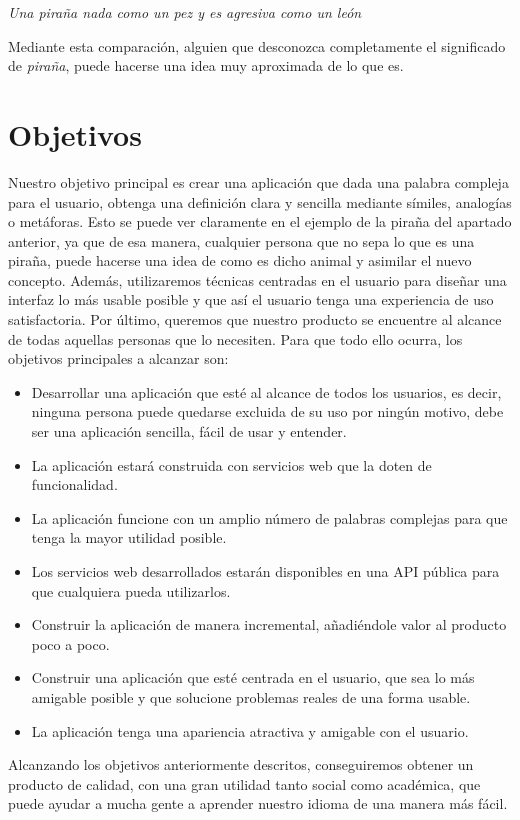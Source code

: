 \textit{Una piraña nada como un pez y es agresiva como un león} \newline

Mediante esta comparación, alguien que desconozca completamente el significado de \textit{piraña}, puede hacerse una idea muy aproximada de lo que es.
\section{Objetivos}
\label{cap:sec:objetivos}
Nuestro objetivo principal es crear una aplicación que dada una palabra compleja para el usuario, obtenga una definición clara y sencilla mediante símiles, analogías o metáforas. 
Esto se puede ver claramente en el ejemplo de la piraña del apartado anterior, ya que de esa manera, cualquier persona que no sepa lo que es una piraña, puede hacerse una idea de como es dicho animal y asimilar el nuevo concepto. Además, utilizaremos técnicas centradas en el usuario para diseñar una interfaz lo más usable posible y que así el usuario tenga una experiencia de uso satisfactoria. Por último, queremos que nuestro producto se encuentre al alcance de todas aquellas personas que lo necesiten.
 Para que todo ello ocurra, los objetivos principales a alcanzar son:
\begin{itemize}
	\item Desarrollar una aplicación que esté al alcance de todos los usuarios, es decir, ninguna persona puede quedarse excluida de su uso por ningún motivo, debe ser una aplicación sencilla, fácil de usar y entender.

	\item La aplicación estará construida con servicios web que la doten de funcionalidad.
	
	\item La aplicación funcione con un amplio número de palabras complejas para que tenga la mayor utilidad posible.
	
	\item Los servicios web desarrollados estarán disponibles en una API pública para que cualquiera pueda utilizarlos.
	
	\item Construir la aplicación de manera incremental, añadiéndole valor al producto poco a poco.
	
	\item Construir una aplicación que esté centrada en el usuario, que sea lo más amigable posible y que solucione problemas reales de una forma usable.
		
	\item La aplicación tenga una apariencia atractiva y amigable con el usuario.
\end{itemize}
Alcanzando los objetivos anteriormente descritos, conseguiremos obtener un producto de calidad, con una gran utilidad tanto social como académica, que puede ayudar a mucha gente a aprender nuestro idioma de una manera más fácil.

